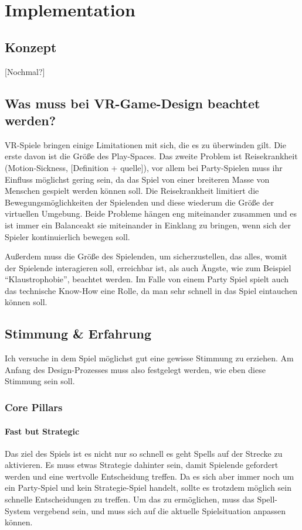 \chapter{Implementation}

\section{Konzept}

[Nochmal?]

\section{Was muss bei VR-Game-Design beachtet werden?}

VR-Spiele bringen einige Limitationen mit sich, die es zu überwinden gilt. Die erste davon ist die Größe des Play-Spaces. Das zweite Problem ist Reisekrankheit (Motion-Sickness, [Definition + quelle]), vor allem bei Party-Spielen muss ihr Einfluss möglichst gering sein, da das Spiel von einer breiteren Masse von Menschen gespielt werden können soll. Die Reisekrankheit limitiert die Bewegungsmöglichkeiten der Spielenden und diese wiederum die Größe der virtuellen Umgebung. Beide Probleme hängen eng miteinander zusammen und es ist immer ein Balanceakt sie miteinander in Einklang zu bringen, wenn sich der Spieler kontinuierlich bewegen soll. 

Außerdem muss die Größe des Spielenden, um sicherzustellen, das alles, womit der Spielende interagieren soll, erreichbar ist, als auch Ängste, wie zum Beispiel "`Klaustrophobie"', beachtet werden. Im Falle von einem Party Spiel spielt auch das technische Know-How eine Rolle, da man sehr schnell in das Spiel eintauchen können soll.

\section{Stimmung \& Erfahrung}

Ich versuche in dem Spiel möglichst gut eine gewisse Stimmung zu erziehen. Am Anfang des Design-Prozesses muss also festgelegt werden, wie eben diese Stimmung sein soll.

\subsection{Core Pillars}

\subsubsection{Fast but Strategic}
Das ziel des Spiels ist es nicht nur so schnell es geht Spells auf der Strecke zu aktivieren. Es muss etwas Strategie dahinter sein, damit Spielende gefordert werden und eine wertvolle Entscheidung treffen. Da es sich aber immer noch um ein Party-Spiel und kein Strategie-Spiel handelt, sollte es trotzdem möglich sein schnelle Entscheidungen zu treffen. Um das zu ermöglichen, muss das Spell-System vergebend sein, und muss sich auf die aktuelle Spielsituation anpassen können. 

